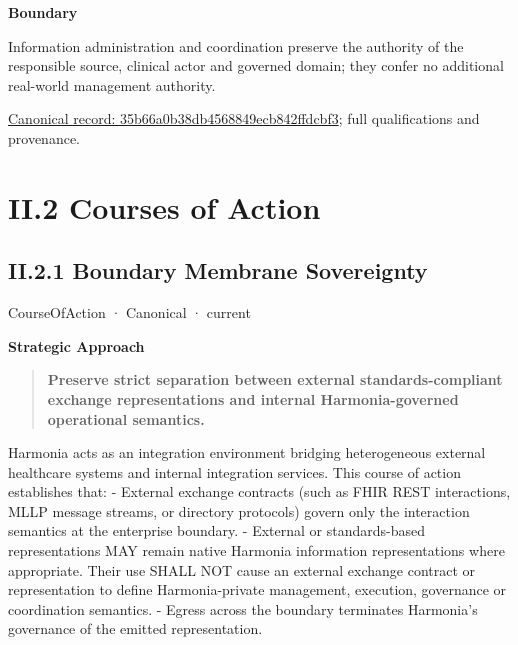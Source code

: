 \textbf{Boundary}



Information administration and coordination preserve the authority of the responsible source, clinical actor and governed domain; they confer no additional real-world management authority.


{\footnotesize \href{../../../../../../../continuum/strategy/capability/35b66a0b38db4568849ecb842ffdcbf3.md}{Canonical record: 35b66a0b38db4568849ecb842ffdcbf3}; full qualifications and provenance.}\par
\chapter*{II.2 Courses of Action}
\label{navigation:II.2}

\section*{II.2.1 Boundary Membrane Sovereignty}
\label{navigation:II.2.1}

\label{element:25d8509146fd4f2794a17f4a5253b7a3}
{\small CourseOfAction · Canonical · current}\par

\par\medskip\textbf{Strategic Approach}\par


\begin{quote}


\textbf{Preserve strict separation between external standards-compliant exchange representations and internal Harmonia-governed operational semantics.}



\end{quote}


Harmonia acts as an integration environment bridging heterogeneous external healthcare systems and internal integration services. This course of action establishes that:
- External exchange contracts (such as FHIR REST interactions, MLLP message streams, or directory protocols) govern only the interaction semantics at the enterprise boundary.
- External or standards-based representations MAY remain native Harmonia information representations where appropriate. Their use SHALL NOT cause an external exchange contract or representation to define Harmonia-private management, execution, governance or coordination semantics.
- Egress across the boundary terminates Harmonia's governance of the emitted representation.




